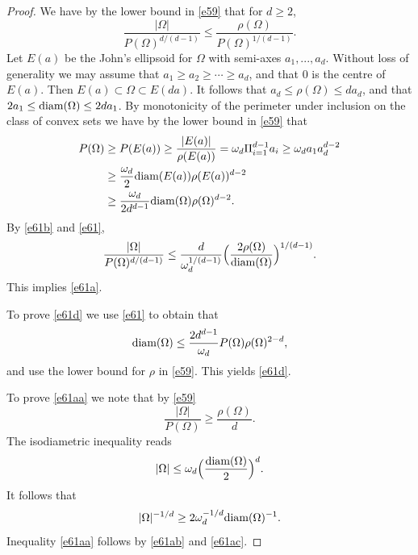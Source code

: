 \documentclass[a4paper,9pt]{article}
\newcommand{\Om}{\Omega}
\begin{document}
\begin{proof}
We have by the lower bound in \eqref{e59} that for $d\ge 2$,
\begin{equation}\label{e61b}
\frac{|\Om|}{P(\Om)^{d/(d-1)}}\le\frac{\rho(\Om)}{P(\Om)^{1/(d-1)}}.
\end{equation}
Let $E(a)$ be the John's ellipsoid for $\Omega$ with semi-axes $a_1,...,a_d$. Without loss of generality we may assume that $a_1 \ge a_2 \ge \cdots \ge a_d$, and that $0$ is the centre of $E(a)$.
Then $E(a)\subset \Omega\subset E(da)$. It follows that $a_d\le \rho(\Omega)\le da_d$, and that $2a_1\le \textup{diam}(\Omega)\le 2da_1$. By monotonicity of the perimeter under inclusion on the class of convex sets we have by the lower bound in \eqref{e59} that
\begin{align}\label{e61}
P(\Om)&\ge P(E(a))\ge \frac{|E(a)|}{\rho(E(a))}=\omega_d\Pi_{i=1}^{d-1}a_i\ge \omega_da_1a_d^{d-2}\nonumber\\&
\ge \frac{\omega_d}{2}\textup{diam}(E(a))\rho(E(a))^{d-2}\nonumber\\&
\ge \frac{\omega_d}{2d^{d-1}}\textup{diam}(\Om)\rho(\Om)^{d-2}.
\end{align}
By \eqref{e61b} and \eqref{e61},
\begin{equation*}%
\frac{|\Om|}{P(\Om)^{d/(d-1)}}\le\frac{d}{\omega_d^{1/(d-1)}}\Big(\frac{2\rho(\Om)}{\textup{diam}(\Om)}\Big)^{1/(d-1)}.
\end{equation*}
This implies \eqref{e61a}.

To prove \eqref{e61d} we use \eqref{e61} to obtain that
\begin{equation}\label{e61e}
\textup{diam}(\Om)\le \frac{2d^{d-1}}{\omega_d}P(\Om)\rho(\Om)^{2-d},
\end{equation}
and use the lower bound for $\rho $ in \eqref{e59}. This yields \eqref{e61d}.

To prove \eqref{e61aa} we note that by \eqref{e59}
\begin{equation}\label{e61ab}
\frac{|\Om|}{P(\Om)}\ge \frac{\rho(\Om)}{d}.
\end{equation}
The isodiametric inequality \cite[p.69]{EG} reads
$$ |\Om|\le \omega_d\Big(\frac{\textup{diam}(\Om)}{2}\Big)^d.$$
It follows that
\begin{equation}\label{e61ac}
|\Om|^{-1/d}\ge 2\omega_d^{-1/d}\textup{diam}(\Om)^{-1}.
\end{equation}
Inequality \eqref{e61aa} follows by \eqref{e61ab} and \eqref{e61ac}.
\end{proof}
\end{document}
